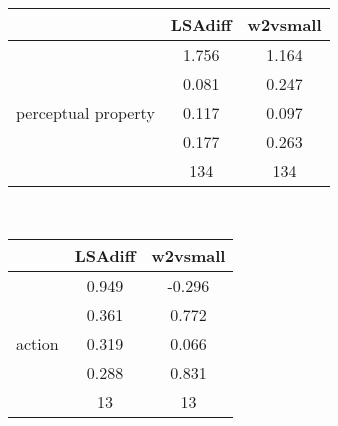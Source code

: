 \documentclass{article}
\begin{document}
\begin{tabular}{ccc|}\cline{2-3}
&\multicolumn{1}{|c}{LSAdiff} & w2vsmall \\\hline
\multicolumn{1}{|c|}{\multirow{5}{*}{perceptual property}} & 1.756 & 1.164 \\
\multicolumn{1}{|c|}{} & 0.081 & 0.247 \\
\multicolumn{1}{|c|}{} & 0.117 & 0.097 \\
\multicolumn{1}{|c|}{} & 0.177 & 0.263 \\
\multicolumn{1}{|c|}{} & 134 & 134 \\
\hline
\end{tabular}\\
\begin{tabular}{ccc|}\cline{2-3}
&\multicolumn{1}{|c}{LSAdiff} & w2vsmall \\\hline
\multicolumn{1}{|c|}{\multirow{5}{*}{action}} & 0.949 & -0.296 \\
\multicolumn{1}{|c|}{} & 0.361 & 0.772 \\
\multicolumn{1}{|c|}{} & 0.319 & 0.066 \\
\multicolumn{1}{|c|}{} & 0.288 & 0.831 \\
\multicolumn{1}{|c|}{} & 13 & 13 \\
\hline
\end{tabular}\\
\end{document}
